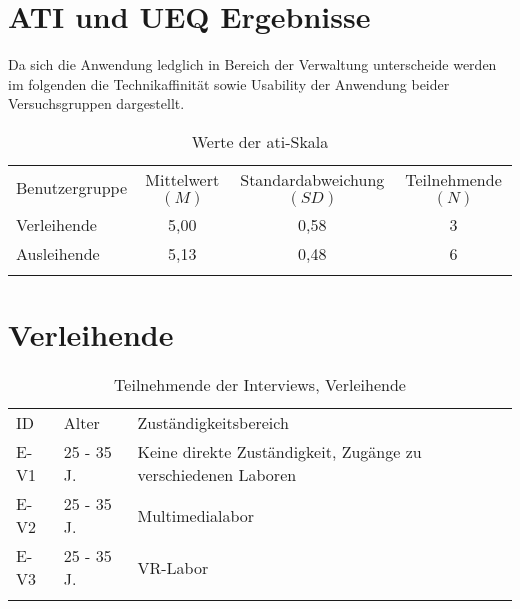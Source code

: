 \section{ATI und UEQ Ergebnisse}
Da sich die Anwendung ledglich in Bereich der Verwaltung unterscheide werden im
folgenden die Technikaffinität sowie Usability der Anwendung beider
Versuchsgruppen dargestellt.

\begin{table}[h]
  \centering
  \caption{Werte der \ac{ati}-Skala}
  \begin{tabular}{lccc}
    \arrayrulecolor{maincolor}\hline
    \sffamily\color{maincolor}Benutzergruppe &
    \sffamily\color{maincolor}Mittelwert $(M)$
                                             & \sffamily\color{maincolor}Standardabweichung $(SD)$ &
    \sffamily\color{maincolor}Teilnehmende $(N)$
    \\
    \arrayrulecolor{maincolor}\hline
    Verleihende                              & 5,00
                                             & 0,58                                                & 3
    \\
    Ausleihende                              & 5,13
                                             & 0,48                                                & 6
    \\
    \arrayrulecolor{maincolor}\hline
  \end{tabular}
  \label{table:atipartzwei}
\end{table}



\section{Verleihende}
\begin{table}[h]
  \centering
  \caption{Teilnehmende der Interviews, Verleihende}
  \begin{tabular}{lll}
    \arrayrulecolor{maincolor}\hline
    \sffamily\color{maincolor}ID & \sffamily\color{maincolor}Alter &
    \sffamily\color{maincolor}Zuständigkeitsbereich
    \\
    \arrayrulecolor{maincolor}\hline
    E-V1                         & 25 - 35 J.                      & Keine
    direkte Zuständigkeit, Zugänge zu verschiedenen Laboren
    \\
    E-V2                         & 25 - 35 J.                      &
    Multimedialabor                                                           \\
    E-V3                         & 25 - 35 J.                      & VR-Labor \\
    \arrayrulecolor{maincolor}\hline
  \end{tabular}
  \label{table:vzwei}
\end{table}

